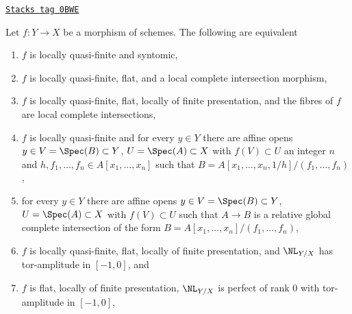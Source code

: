 \begin{lemma}
\label{discriminant-lemma-syntomic-quasi-finite}
\href{https://stacks.math.columbia.edu/tag/0BWE}{\texttt{Stacks tag 0BWE}}

Let $f : Y \to X$ be a morphism of schemes. The following are equivalent
\begin{enumerate}
\item $f$ is locally quasi-finite and syntomic,
\item $f$ is locally quasi-finite, flat, and a local complete intersection
morphism,
\item $f$ is locally quasi-finite, flat, locally of finite presentation,
and the fibres of $f$ are local complete intersections,
\item $f$ is locally quasi-finite and for every $y \in Y$ there are
affine opens $y \in V = \Spec(B) \subset Y$, $U = \Spec(A) \subset X$
with $f(V) \subset U$ an integer $n$ and
$h, f_1, \ldots, f_n \in A[x_1, \ldots, x_n]$ such that
$B = A[x_1, \ldots, x_n, 1/h]/(f_1, \ldots, f_n)$,
\item for every $y \in Y$ there are affine opens
$y \in V = \Spec(B) \subset Y$, $U = \Spec(A) \subset X$
with $f(V) \subset U$ such that $A \to B$ is a relative global complete
intersection of the form $B = A[x_1, \ldots, x_n]/(f_1, \ldots, f_n)$,
\item $f$ is locally quasi-finite, flat, locally of finite presentation,
and $\NL_{Y/X}$ has tor-amplitude in $[-1, 0]$, and
\item $f$ is flat, locally of finite presentation,
$\NL_{Y/X}$ is perfect of rank $0$ with tor-amplitude in $[-1, 0]$,
\end{enumerate}
\end{lemma}

